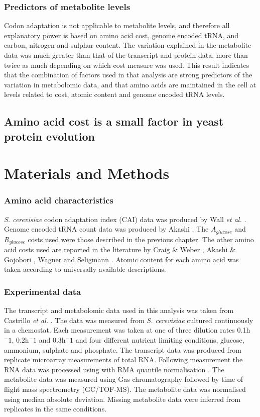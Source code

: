 \subsubsection{Predictors of metabolite levels}

Codon adaptation is not applicable to metabolite levels, and therefore all explanatory power is based on amino acid cost, genome encoded tRNA, and carbon, nitrogen and sulphur content. The variation explained in the metabolite data was much greater than that of the transcript and protein data, more than twice as much depending on which cost measure was used. This result indicates that the combination of factors used in that analysis are strong predictors of the variation in metabolomic data, and that amino acids are maintained in the cell at levels related to cost, atomic content and genome encoded tRNA levels.

\subsection{Amino acid cost is a small factor in yeast protein evolution}

\section{Materials and Methods}

\subsubsection{Amino acid characteristics}

\emph{S. cerevisiae} codon adaptation index (CAI) data was produced by Wall \emph{et al.} \cite{wall2005}. Genome encoded tRNA count data was produced by Akashi \cite{akashi_trna}. The $A_{glucose}$ and $R_{glucose}$ costs used were those described in the previous chapter. The other amino acid costs used are reported in the literature by Craig \& Weber \cite{craig1998}, Akashi \& Gojobori \cite{akashi2002}, Wagner \cite{wagner2005} and Seligmann \cite{seligmann2004}. Atomic content for each amino acid was taken according to universally available descriptions.

\subsubsection{Experimental data}

The transcript and metabolomic data used in this analysis was taken from Castrillo \emph{et al.} \cite{castrillo2007}. The data was measured from \emph{S. cerevisiae} cultured continuously in a chemostat. Each measurement was taken at one of three dilution rates 0.1h$^-1$, 0.2h$^-1$ and 0.3h$^-1$ and four different nutrient limiting conditions, glucose, ammonium, sulphate and phosphate. The transcript data was produced from replicate microarray measurements of total RNA. Following measurement the RNA data was processed using with RMA quantile normalisation \cite{RMA}. The metabolite data was measured using Gas chromatography followed by time of flight mass spectrometry (GC/TOF-MS). The metabolite data was normalised using median absolute deviation. Missing metabolite data were inferred from replicates in the same conditions.

